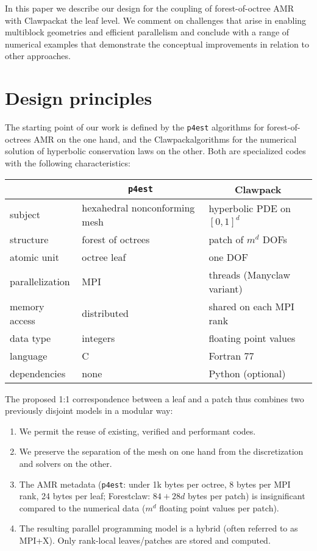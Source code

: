 \documentclass{IOS-Book-Article}     %
\newcommand{\comment}[1]{\textcolor{green}{[DAC: #1]}\xspace}
\newcommand{\clawpack}{{\sc Clawpack\xspace}}
\newcommand{\forestclaw}{Forestclaw\xspace}
\newcommand{\pforest}{\texttt{p4est}\xspace}
\begin{document}
In this paper we describe our design for the coupling of forest-of-octree AMR
with \clawpack at the leaf level.  We comment on challenges that arise in
enabling multiblock geometries and efficient parallelism and conclude with a range
of numerical examples that demonstrate the conceptual improvements in relation
to other approaches.

\section{Design principles}

The starting point of our work is defined by the \pforest algorithms for
forest-of-octrees AMR on the one hand, and the \clawpack algorithms for the
numerical solution of hyperbolic conservation laws
on the other.  Both are specialized codes with the following characteristics:
\begin{center}
\begin{tabular}{l|l|l}
& \multicolumn{1}{c|}{\pforest} & \multicolumn{1}{c}{Clawpack} \\
\hline
subject & hexahedral nonconforming mesh &  hyperbolic PDE on $[0, 1]^d$ \\
structure & forest of octrees & patch of $m^d$ DOFs \\
atomic unit & octree leaf & one DOF \\
parallelization & MPI & threads (Manyclaw variant) \\
memory access & distributed & shared on each MPI rank \\
data type & integers & floating point values \\
language & C & Fortran 77 \\
dependencies & none & Python (optional) \\
\end{tabular}
\end{center}
The proposed 1:1 correspondence between a leaf and a patch thus combines two
previously disjoint models in a modular way:
\begin{enumerate}
\item We permit the reuse of existing, verified and performant codes.
\item We preserve the separation of the mesh on one hand from the
discretization and solvers on the other.
\item The AMR metadata (\pforest:
under 1k bytes per octree, 8 bytes per MPI rank,
24 bytes per leaf; \forestclaw: $84 + 28d$ bytes per patch)
is insignificant compared to
the numerical data ($m^d$ floating point values per patch).
\item The resulting parallel programming model is a hybrid (often referred
to as MPI+X).  Only rank-local leaves/patches are stored and computed.
\end{enumerate}
\end{document}
